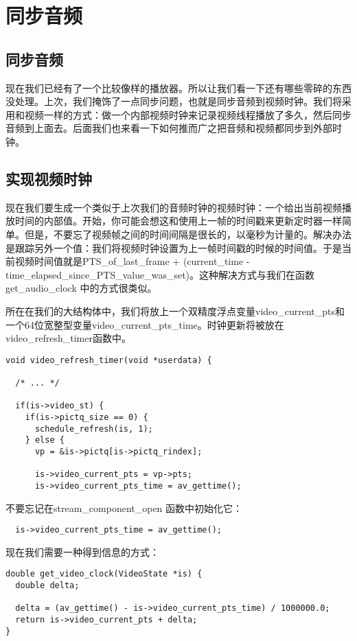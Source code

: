 ﻿\chapter{同步音频}
\label{ch6}
\section{同步音频}
现在我们已经有了一个比较像样的播放器。所以让我们看一下还有哪些零碎的东西没处理。上次，我们掩饰了一点同步问题，也就是同步音频到视频时钟。我们将采用和视频一样的方式：做一个内部视频时钟来记录视频线程播放了多久，然后同步音频到上面去。后面我们也来看一下如何推而广之把音频和视频都同步到外部时钟。

\section{实现视频时钟}
现在我们要生成一个类似于上次我们的音频时钟的视频时钟：一个给出当前视频播放时间的内部值。开始，你可能会想这和使用上一帧的时间戳来更新定时器一样简单。但是，不要忘了视频帧之间的时间间隔是很长的，以毫秒为计量的。解决办法是跟踪另外一个值：我们将视频时钟设置为上一帧时间戳的时候的时间值。于是当前视频时间值就是PTS_of_last_frame + (current_time -time_elapsed_since_PTS_value_was_set)。这种解决方式与我们在函数get_audio_clock 中的方式很类似。

所在在我们的大结构体中，我们将放上一个双精度浮点变量video_current_pts和一个64位宽整型变量video_current_pts_time。时钟更新将被放在video_refresh_timer函数中。

\begin{lstlisting}
void video_refresh_timer(void *userdata) {

  /* ... */

  if(is->video_st) {
    if(is->pictq_size == 0) {
      schedule_refresh(is, 1);
    } else {
      vp = &is->pictq[is->pictq_rindex];

      is->video_current_pts = vp->pts;
      is->video_current_pts_time = av_gettime();
\end{lstlisting}
不要忘记在stream_component_open 函数中初始化它：
\begin{lstlisting}
  is->video_current_pts_time = av_gettime();
\end{lstlisting}
现在我们需要一种得到信息的方式：
\begin{lstlisting}
double get_video_clock(VideoState *is) {
  double delta;

  delta = (av_gettime() - is->video_current_pts_time) / 1000000.0;
  return is->video_current_pts + delta;
}
\end{lstlisting}
